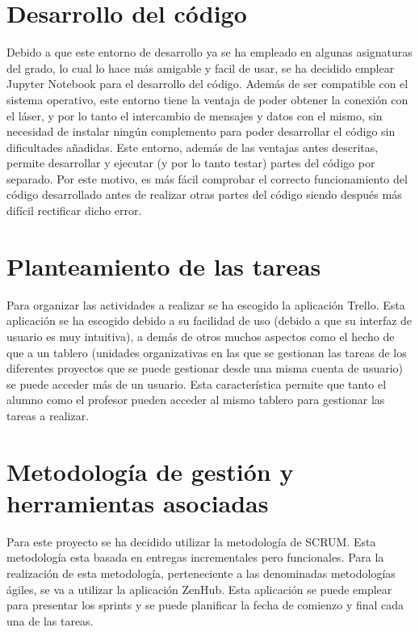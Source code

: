 \section{Desarrollo del código}

Debido a que este entorno de desarrollo ya se ha empleado en algunas asignaturas del grado, lo cual lo hace más amigable y facil de usar, se ha decidido emplear Jupyter Notebook para el desarrollo del código. Además de ser compatible con el sistema operativo, este entorno tiene la ventaja de poder obtener la conexión con el láser, y por lo tanto el intercambio de mensajes y datos con el mismo, sin necesidad de instalar ningún complemento para poder desarrollar el código sin dificultades añadidas.
Este entorno, además de las ventajas antes descritas, permite desarrollar y ejecutar (y por lo tanto testar) partes del código por separado. Por este motivo, es más fácil comprobar el correcto funcionamiento del código desarrollado antes de realizar otras partes del código siendo después más difícil rectificar dicho error.

\section{Planteamiento de las tareas}

Para organizar las actividades a realizar se ha escogido la aplicación Trello. Esta aplicación se ha escogido debido a su facilidad de uso (debido a que su interfaz de usuario es muy intuitiva), a demás de otros muchos aspectos como el hecho de que a un tablero (unidades organizativas en las que se gestionan las tareas de los diferentes proyectos que se puede gestionar desde una misma cuenta de usuario) se puede acceder más de un usuario. Esta característica permite que tanto el alumno como el profesor pueden acceder al mismo tablero para gestionar las tareas a realizar.

\section{Metodología de gestión y herramientas asociadas}

Para este proyecto se ha decidido utilizar la metodología de SCRUM. Esta metodología esta basada en entregas incrementales pero funcionales. Para la realización de esta metodología, perteneciente a las denominadas metodologías ágiles, se va a utilizar la aplicación ZenHub. Esta aplicación se puede emplear para presentar los sprints y se puede planificar la fecha de comienzo y final cada una de las tareas.

